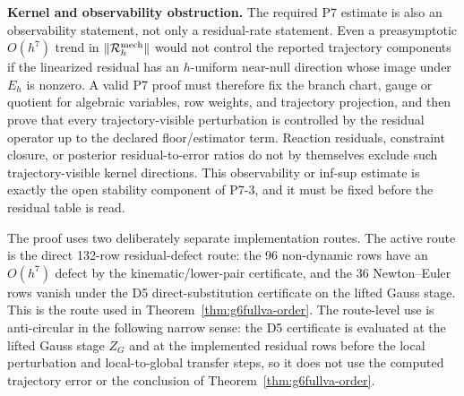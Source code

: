 \documentclass[preprint,12pt]{elsarticle}
\begin{document}
\noindent\textbf{Kernel and observability obstruction.}
The required P7 estimate is also an observability statement, not only a
residual-rate statement.  Even a preasymptotic \(O(h^7)\) trend in
\(\|\mathcal R_h^{\rm mech}\|\) would not control the reported
trajectory components if the linearized residual has an \(h\)-uniform
near-null direction whose image under \(E_h\) is nonzero.  A valid P7 proof
must therefore fix the branch chart, gauge or quotient for algebraic
variables, row weights, and trajectory projection, and then prove that every
trajectory-visible perturbation is controlled by the residual operator up to
the declared floor/estimator term.  Reaction residuals, constraint closure,
or posterior residual-to-error ratios do not by themselves exclude such
trajectory-visible kernel directions.  This observability or inf-sup estimate
is exactly the open stability component of P7-3, and it must be fixed
before the residual table is read.

The proof uses two deliberately separate implementation routes. The active
route is the direct 132-row residual-defect route: the 96 non-dynamic rows
have an \(O(h^7)\) defect by the kinematic/lower-pair certificate, and the
36 Newton--Euler rows vanish under the D5 direct-substitution certificate on
the lifted Gauss stage. This is the route used in
Theorem~\ref{thm:g6fullva-order}. The route-level use is
anti-circular in the following narrow sense: the D5 certificate is evaluated
at the lifted Gauss stage \(Z_G\) and at the implemented residual rows before
the local perturbation and local-to-global transfer steps, so it does not use
the computed trajectory error or the conclusion of
Theorem~\ref{thm:g6fullva-order}.
\end{document}

